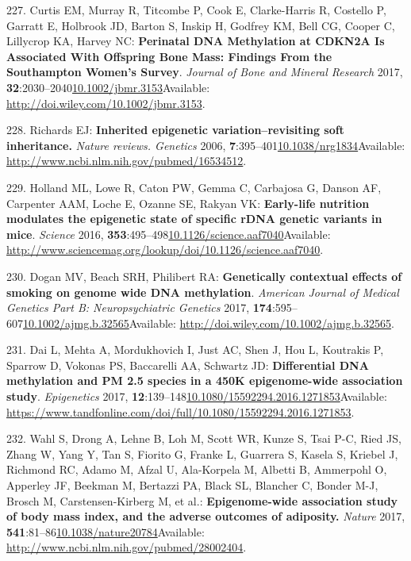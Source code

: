 \documentclass[
]{book}
\begin{document}
\leavevmode\hypertarget{ref-Curtis2017}{}%
227. Curtis EM, Murray R, Titcombe P, Cook E, Clarke-Harris R, Costello P, Garratt E, Holbrook JD, Barton S, Inskip H, Godfrey KM, Bell CG, Cooper C, Lillycrop KA, Harvey NC: \textbf{Perinatal DNA Methylation at CDKN2A Is Associated With Offspring Bone Mass: Findings From the Southampton Women's Survey}. \emph{Journal of Bone and Mineral Research} 2017, \textbf{32}:2030--2040\href{https://doi.org/10.1002/jbmr.3153}{10.1002/jbmr.3153}Available: \url{http://doi.wiley.com/10.1002/jbmr.3153}.

\leavevmode\hypertarget{ref-Richards2006}{}%
228. Richards EJ: \textbf{Inherited epigenetic variation--revisiting soft inheritance.} \emph{Nature reviews. Genetics} 2006, \textbf{7}:395--401\href{https://doi.org/10.1038/nrg1834}{10.1038/nrg1834}Available: \url{http://www.ncbi.nlm.nih.gov/pubmed/16534512}.

\leavevmode\hypertarget{ref-Holland2017}{}%
229. Holland ML, Lowe R, Caton PW, Gemma C, Carbajosa G, Danson AF, Carpenter AAM, Loche E, Ozanne SE, Rakyan VK: \textbf{Early-life nutrition modulates the epigenetic state of specific rDNA genetic variants in mice}. \emph{Science} 2016, \textbf{353}:495--498\href{https://doi.org/10.1126/science.aaf7040}{10.1126/science.aaf7040}Available: \url{http://www.sciencemag.org/lookup/doi/10.1126/science.aaf7040}.

\leavevmode\hypertarget{ref-Dogan2017}{}%
230. Dogan MV, Beach SRH, Philibert RA: \textbf{Genetically contextual effects of smoking on genome wide DNA methylation}. \emph{American Journal of Medical Genetics Part B: Neuropsychiatric Genetics} 2017, \textbf{174}:595--607\href{https://doi.org/10.1002/ajmg.b.32565}{10.1002/ajmg.b.32565}Available: \url{http://doi.wiley.com/10.1002/ajmg.b.32565}.

\leavevmode\hypertarget{ref-Dai2016}{}%
231. Dai L, Mehta A, Mordukhovich I, Just AC, Shen J, Hou L, Koutrakis P, Sparrow D, Vokonas PS, Baccarelli AA, Schwartz JD: \textbf{Differential DNA methylation and PM 2.5 species in a 450K epigenome-wide association study}. \emph{Epigenetics} 2017, \textbf{12}:139--148\href{https://doi.org/10.1080/15592294.2016.1271853}{10.1080/15592294.2016.1271853}Available: \url{https://www.tandfonline.com/doi/full/10.1080/15592294.2016.1271853}.

\leavevmode\hypertarget{ref-Wahl2016}{}%
232. Wahl S, Drong A, Lehne B, Loh M, Scott WR, Kunze S, Tsai P-C, Ried JS, Zhang W, Yang Y, Tan S, Fiorito G, Franke L, Guarrera S, Kasela S, Kriebel J, Richmond RC, Adamo M, Afzal U, Ala-Korpela M, Albetti B, Ammerpohl O, Apperley JF, Beekman M, Bertazzi PA, Black SL, Blancher C, Bonder M-J, Brosch M, Carstensen-Kirberg M, et al.: \textbf{Epigenome-wide association study of body mass index, and the adverse outcomes of adiposity.} \emph{Nature} 2017, \textbf{541}:81--86\href{https://doi.org/10.1038/nature20784}{10.1038/nature20784}Available: \url{http://www.ncbi.nlm.nih.gov/pubmed/28002404}.
\end{document}

